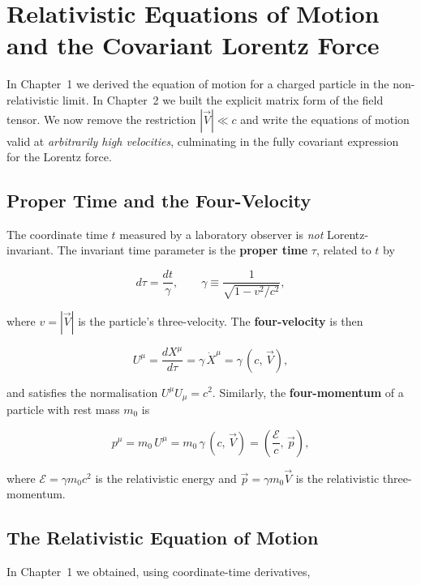 \chapter{Relativistic Equations of Motion and the Covariant Lorentz Force}

In Chapter~1 we derived the equation of motion for a charged particle in the non-relativistic limit. In Chapter~2 we built the explicit matrix form of the field tensor. We now remove the restriction $|\vec{V}| \ll c$ and write the equations of motion valid at \emph{arbitrarily high velocities}, culminating in the fully covariant expression for the Lorentz force.

\section{Proper Time and the Four-Velocity}

The coordinate time $t$ measured by a laboratory observer is \emph{not} Lorentz-invariant. The invariant time parameter is the \textbf{proper time} $\tau$, related to $t$ by

\begin{equation}
d\tau = \frac{dt}{\gamma}, \qquad \gamma \equiv \frac{1}{\sqrt{1 - v^2/c^2}},
\end{equation}

where $v = |\vec{V}|$ is the particle's three-velocity. The \textbf{four-velocity} is then

\begin{equation}
U^\mu = \frac{dX^\mu}{d\tau} = \gamma\,\dot{X}^\mu = \gamma\,(c,\,\vec{V}),
\end{equation}

and satisfies the normalisation $U^\mu U_\mu = c^2$. Similarly, the \textbf{four-momentum} of a particle with rest mass $m_0$ is

\begin{equation}
p^\mu = m_0\,U^\mu = m_0\,\gamma\,(c,\,\vec{V}) = \left(\frac{\mathcal{E}}{c},\,\vec{p}\right),
\end{equation}

where $\mathcal{E} = \gamma m_0 c^2$ is the relativistic energy and $\vec{p} = \gamma m_0 \vec{V}$ is the relativistic three-momentum.

\section{The Relativistic Equation of Motion}

In Chapter~1 we obtained, using coordinate-time derivatives,

